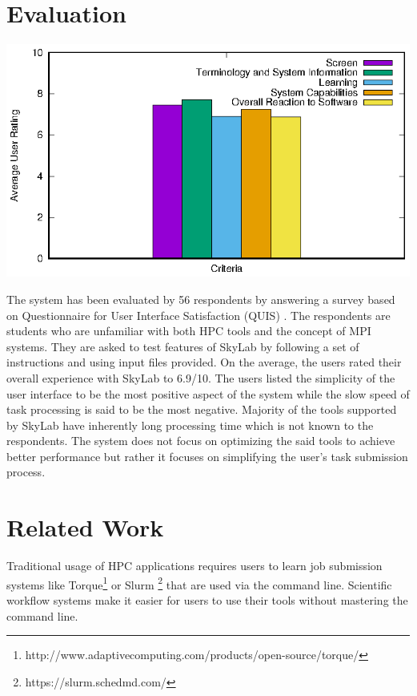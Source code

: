 	
\section{Evaluation}
	\begin{center}			
			\includegraphics{./images/rating.eps}			
	\end{center}
	The system has been evaluated by 56 respondents by answering a survey based on Questionnaire for User Interface Satisfaction (QUIS) \cite{chin1988development}. The respondents are students who are unfamiliar with both HPC tools and the concept of MPI systems.  They are asked to test features of SkyLab by following a set of instructions and using input files provided. On the average, the users rated their overall experience with SkyLab to 6.9/10. The users listed the simplicity of the user interface to be the most positive aspect of the system while the slow speed of task processing is said to be the most negative. Majority of the tools supported by SkyLab have inherently long processing time which is not known to the respondents. The system does not focus on optimizing the said tools to achieve better performance but rather it focuses on simplifying the user's task submission process. 

\section{Related Work}
Traditional usage of HPC applications requires users to learn job submission systems like Torque\footnote{http://www.adaptivecomputing.com/products/open-source/torque/} or Slurm \footnote{https://slurm.schedmd.com/} that are used via the command line. Scientific workflow systems make it easier for users to use their tools without mastering the command line.

